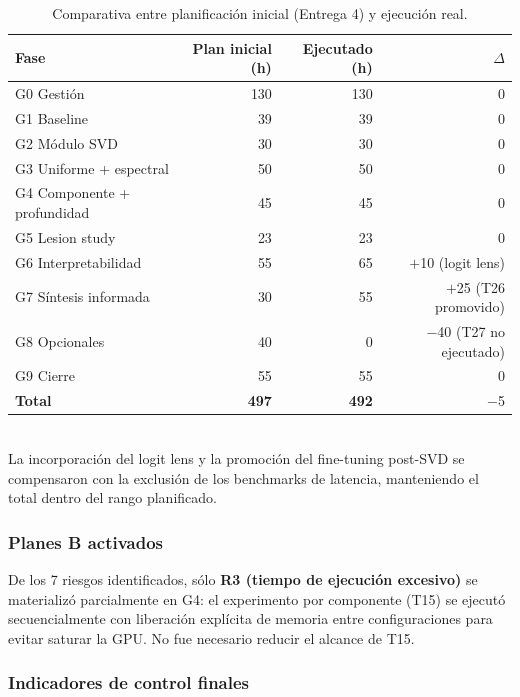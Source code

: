 \begin{table}[H]
\centering
\caption{Comparativa entre planificación inicial (Entrega 4) y ejecución
real.}
\label{tab:gep-balance-horas}
\small
\begin{tabular}{@{}l r r r@{}}
\toprule
\textbf{Fase} & \textbf{Plan inicial (h)} & \textbf{Ejecutado (h)} & \textbf{$\Delta$} \\
\midrule
G0 Gestión                    & 130 & 130 & 0 \\
G1 Baseline                   & 39  & 39  & 0 \\
G2 Módulo SVD                 & 30  & 30  & 0 \\
G3 Uniforme + espectral       & 50  & 50  & 0 \\
G4 Componente + profundidad   & 45  & 45  & 0 \\
G5 Lesion study               & 23  & 23  & 0 \\
G6 Interpretabilidad          & 55  & 65  & $+$10 (logit lens) \\
G7 Síntesis informada         & 30  & 55  & $+$25 (T26 promovido) \\
G8 Opcionales                 & 40  & 0   & $-$40 (T27 no ejecutado) \\
G9 Cierre                     & 55  & 55  & 0 \\
\midrule
\textbf{Total}                & \textbf{497} & \textbf{492} & $-$5 \\
\bottomrule
\end{tabular}
\\[0.15cm]{\small La incorporación del logit lens y la promoción del fine-tuning post-SVD se compensaron con la exclusión de los benchmarks de latencia, manteniendo el total dentro del rango planificado.}
\end{table}

\subsubsection{Planes B activados}

De los 7 riesgos identificados, sólo \textbf{R3 (tiempo de ejecución
excesivo)} se materializó parcialmente en G4: el experimento por
componente (T15) se ejecutó secuencialmente con liberación explícita de
memoria entre configuraciones para evitar saturar la GPU. No fue
necesario reducir el alcance de T15.

\subsubsection{Indicadores de control finales}

